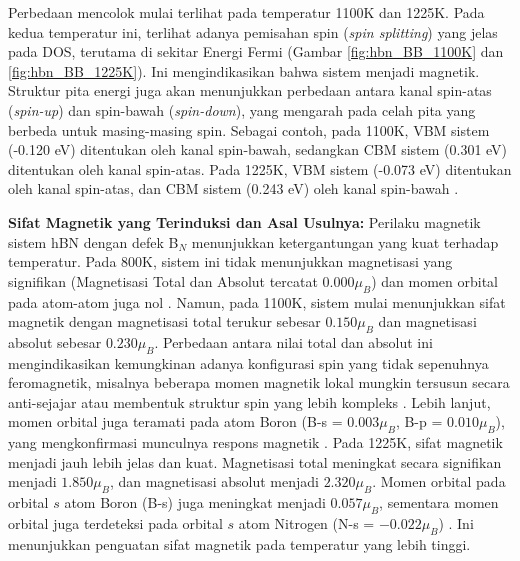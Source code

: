 Perbedaan mencolok mulai terlihat pada temperatur 1100K dan 1225K. Pada kedua temperatur ini, terlihat adanya pemisahan spin (\textit{spin splitting}) yang jelas pada DOS, terutama di sekitar Energi Fermi (Gambar \ref{fig:hbn_BB_1100K} dan \ref{fig:hbn_BB_1225K}). Ini mengindikasikan bahwa sistem menjadi magnetik. Struktur pita energi juga akan menunjukkan perbedaan antara kanal spin-atas (\textit{spin-up}) dan spin-bawah (\textit{spin-down}), yang mengarah pada celah pita yang berbeda untuk masing-masing spin. Sebagai contoh, pada 1100K, VBM sistem (-0.120 eV) ditentukan oleh kanal spin-bawah, sedangkan CBM sistem (0.301 eV) ditentukan oleh kanal spin-atas. Pada 1225K, VBM sistem (-0.073 eV) ditentukan oleh kanal spin-atas, dan CBM sistem (0.243 eV) oleh kanal spin-bawah \cite{[1]}.

\textbf{Sifat Magnetik yang Terinduksi dan Asal Usulnya:}
Perilaku magnetik sistem hBN dengan defek B$_N$ menunjukkan ketergantungan yang kuat terhadap temperatur. Pada 800K, sistem ini tidak menunjukkan magnetisasi yang signifikan (Magnetisasi Total dan Absolut tercatat $0.000 \mu_B$) dan momen orbital pada atom-atom juga nol \cite{[1]}. Namun, pada 1100K, sistem mulai menunjukkan sifat magnetik dengan magnetisasi total terukur sebesar $0.150 \mu_B$ dan magnetisasi absolut sebesar $0.230 \mu_B$. Perbedaan antara nilai total dan absolut ini mengindikasikan kemungkinan adanya konfigurasi spin yang tidak sepenuhnya feromagnetik, misalnya beberapa momen magnetik lokal mungkin tersusun secara anti-sejajar atau membentuk struktur spin yang lebih kompleks \cite{[1]}. Lebih lanjut, momen orbital juga teramati pada atom Boron (B-s = $0.003 \mu_B$, B-p = $0.010 \mu_B$), yang mengkonfirmasi munculnya respons magnetik \cite{[1, 1]}. Pada 1225K, sifat magnetik menjadi jauh lebih jelas dan kuat. Magnetisasi total meningkat secara signifikan menjadi $1.850 \mu_B$, dan magnetisasi absolut menjadi $2.320 \mu_B$. Momen orbital pada orbital $s$ atom Boron (B-s) juga meningkat menjadi $0.057 \mu_B$, sementara momen orbital juga terdeteksi pada orbital $s$ atom Nitrogen (N-s = $-0.022 \mu_B$) \cite{[1, 1]}. Ini menunjukkan penguatan sifat magnetik pada temperatur yang lebih tinggi.


